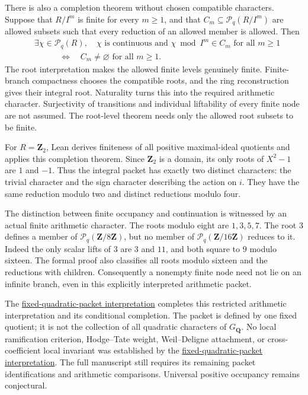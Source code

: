 \documentclass[11pt]{article}
\theoremstyle{definition}
\theoremstyle{remark}
\newcommand{\Z}{\mathbf Z}
\newcommand{\Q}{\mathbf Q}
\begin{document}
There is also a completion theorem without chosen compatible characters.
Suppose that $R/I^m$ is finite for every $m\ge1$, and that
$C_m\subseteq\mathcal P_q(R/I^m)$ are allowed subsets such that every
reduction of an allowed member is allowed. Then
\[
\begin{split}
&\exists\chi\in\mathcal P_q(R),\quad
  \chi\text{ is continuous and }\chi\bmod I^m\in C_m
  \text{ for all }m\ge1\\
&\hspace{3em}\Longleftrightarrow\quad
  C_m\ne\varnothing\text{ for all }m\ge1.
\end{split}
\]
The root interpretation makes the allowed finite levels genuinely finite.
Finite-branch compactness chooses the compatible roots, and the ring
reconstruction gives their integral root. Naturality turns this into the
required arithmetic character. Surjectivity of transitions and individual
liftability of every finite node are not assumed. The root-level theorem
needs only the allowed root subsets to be finite.

For $R=\Z_2$, Lean derives finiteness of all positive maximal-ideal
quotients and applies this completion theorem. Since $\Z_2$ is a domain,
its only roots of $X^2-1$ are $1$ and $-1$. Thus the integral packet has
exactly two distinct characters: the trivial character and the sign
character describing the action on $i$. They have the same reduction
modulo two and distinct reductions modulo four.

The distinction between finite occupancy and continuation is witnessed
by an actual finite arithmetic character. The roots modulo eight are
$1,3,5,7$. The root $3$ defines a member of
$\mathcal P_q(\Z/8\Z)$, but no member of
$\mathcal P_q(\Z/16\Z)$ reduces to it. Indeed the only scalar lifts of
$3$ are $3$ and $11$, and both square to $9$ modulo sixteen. The formal
proof also classifies all roots modulo sixteen and the reductions with
children. Consequently a nonempty finite node need not lie on an
infinite branch, even in this explicitly interpreted arithmetic packet.

The \hyperref[book:x-construction-21]{fixed-quadratic-packet interpretation} completes this restricted arithmetic interpretation and its
conditional completion. The packet is defined by one fixed quotient; it
is not the collection of all quadratic characters of $G_{\Q}$. No local
ramification criterion, Hodge--Tate weight, Weil--Deligne attachment, or
cross-coefficient local invariant was established by the \hyperref[book:x-construction-21]{fixed-quadratic-packet interpretation}. The full
manuscript still requires its remaining packet identifications and
arithmetic comparisons. Universal positive occupancy remains conjectural.
\end{document}
